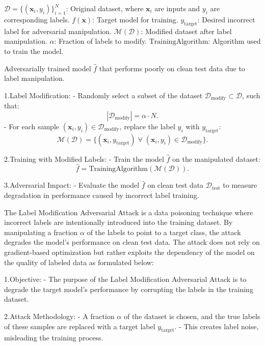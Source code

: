 
$\mathcal{D} = \{(\mathbf{x}_i, y_i)\}_{i=1}^N$: Original dataset, where $\mathbf{x}_i$ are inputs and $y_i$ are corresponding labels.
$f(\mathbf{x})$: Target model for training.
$y_{\text{target}}$: Desired incorrect label for adversarial manipulation.
$\mathcal{M}(\mathcal{D})$: Modified dataset after label manipulation.
$\alpha$: Fraction of labels to modify.
$\text{TrainingAlgorithm}$: Algorithm used to train the model.

Adversarially trained model $\hat{f}$ that performs poorly on clean test data due to label manipulation.

1.Label Modification:
   - Randomly select a subset of the dataset $\mathcal{D}_{\text{modify}} \subset \mathcal{D}$, such that:
     \[
     |\mathcal{D}_{\text{modify}}| = \alpha \cdot N.
     \]
   - For each sample $(\mathbf{x}_i, y_i) \in \mathcal{D}_{\text{modify}}$, replace the label $y_i$ with $y_{\text{target}}$:
     \[
     \mathcal{M}(\mathcal{D}) = \{(\mathbf{x}_i, y_{\text{target}}) \; \forall \; (\mathbf{x}_i, y_i) \in \mathcal{D}_{\text{modify}}\}.
     \]

2.Training with Modified Labels:
   - Train the model $\hat{f}$ on the manipulated dataset:
     \[
     \hat{f} = \text{TrainingAlgorithm}(\mathcal{M}(\mathcal{D})).
     \]

3.Adversarial Impact:
   - Evaluate the model $\hat{f}$ on clean test data $\mathcal{D}_{\text{test}}$ to measure degradation in performance caused by incorrect label training.

The Label Modification Adversarial Attack is a data poisoning technique where incorrect labels are intentionally introduced into the training dataset. By manipulating a fraction $\alpha$ of the labels to point to a target class, the attack degrades the model's performance on clean test data. The attack does not rely on gradient-based optimization but rather exploits the dependency of the model on the quality of labeled data as formulated below:

1.Objective:
   - The purpose of the Label Modification Adversarial Attack is to degrade the target model's performance by corrupting the labels in the training dataset.

2.Attack Methodology:
   - A fraction $\alpha$ of the dataset is chosen, and the true labels of these samples are replaced with a target label $y_{\text{target}}$.
   - This creates label noise, misleading the training process.


